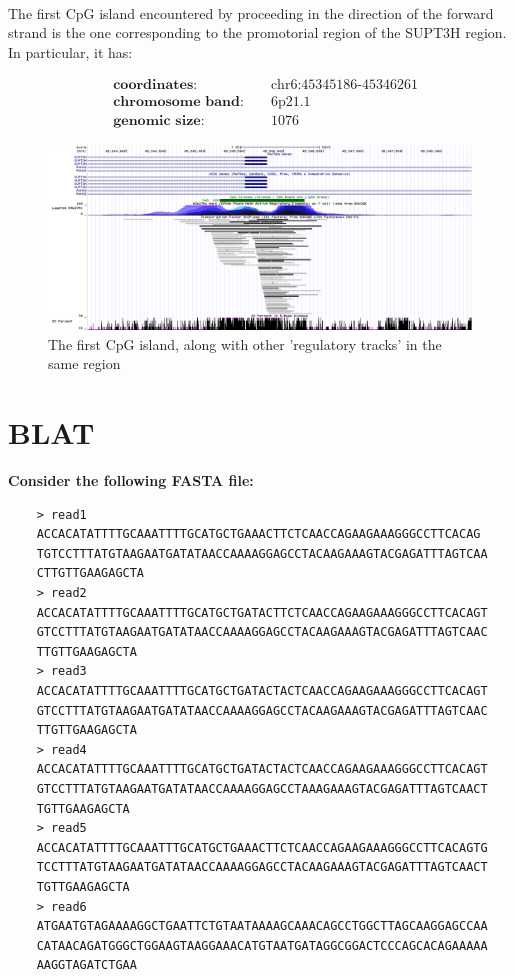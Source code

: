 \documentclass[12pt, a4paper]{article}
\begin{document}
\paragraph{}The first CpG island encountered by proceeding in the direction of the forward strand is the one corresponding to the promotorial region of the SUPT3H region. In particular, it has:%

\begin{align*}
&\textbf{coordinates: } &&\text{chr6:45345186-45346261}\\
&\textbf{chromosome band: } &&\text{6p21.1}\\
&\textbf{genomic size: } && 1076
\end{align*}

\begin{figure}[t]
	\centering
	\label{CpG island}
	\includegraphics[width = \textwidth]{CpG_island}
	\caption{The first CpG island, along with other 'regulatory tracks' in the same region}
\end{figure}

\section{BLAT }

\textbf{Consider the following FASTA file:}

\begin{verbatim}
	> read1
	ACCACATATTTTGCAAATTTTGCATGCTGAAACTTCTCAACCAGAAGAAAGGGCCTTCACAG
	TGTCCTTTATGTAAGAATGATATAACCAAAAGGAGCCTACAAGAAAGTACGAGATTTAGTCAA
	CTTGTTGAAGAGCTA
	> read2
	ACCACATATTTTGCAAATTTTGCATGCTGATACTTCTCAACCAGAAGAAAGGGCCTTCACAGT
	GTCCTTTATGTAAGAATGATATAACCAAAAGGAGCCTACAAGAAAGTACGAGATTTAGTCAAC
	TTGTTGAAGAGCTA
	> read3
	ACCACATATTTTGCAAATTTTGCATGCTGATACTACTCAACCAGAAGAAAGGGCCTTCACAGT
	GTCCTTTATGTAAGAATGATATAACCAAAAGGAGCCTACAAGAAAGTACGAGATTTAGTCAAC
	TTGTTGAAGAGCTA
	> read4
	ACCACATATTTTGCAAATTTTGCATGCTGATACTACTCAACCAGAAGAAAGGGCCTTCACAGT
	GTCCTTTATGTAAGAATGATATAACCAAAAGGAGCCTAAAGAAAGTACGAGATTTAGTCAACT
	TGTTGAAGAGCTA
	> read5
	ACCACATATTTTGCAAATTTGCATGCTGAAACTTCTCAACCAGAAGAAAGGGCCTTCACAGTG
	TCCTTTATGTAAGAATGATATAACCAAAAGGAGCCTACAAGAAAGTACGAGATTTAGTCAACT
	TGTTGAAGAGCTA
	> read6
	ATGAATGTAGAAAAGGCTGAATTCTGTAATAAAAGCAAACAGCCTGGCTTAGCAAGGAGCCAA
	CATAACAGATGGGCTGGAAGTAAGGAAACATGTAATGATAGGCGGACTCCCAGCACAGAAAAA
	AAGGTAGATCTGAA
\end{verbatim}
\end{document}
